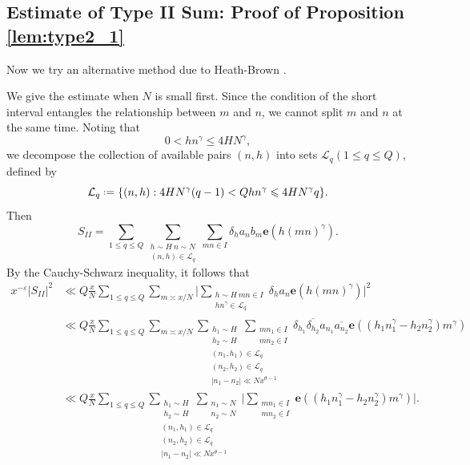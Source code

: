 \documentclass[12pt, reqno, twoside, letterpaper]{amsart}
\numberwithin{equation}{section}
\newcommand{\e}{\ensuremath{\mathbf{e}}}
\newcommand{\cL}{\ensuremath{\mathcal{L}}}
\theoremstyle{customthm}
\theoremstyle{customrem}
\newcommand*{\defeq}{\mathrel{\vcenter{\baselineskip0.5ex \lineskiplimit0pt
			\hbox{\scriptsize.}\hbox{\scriptsize.}}}%
	=}
\begin{document}
\subsection{Estimate of Type II Sum: Proof of Proposition \ref{lem:type2_1}}\label{Estimate of Type II' Sum}

Now we try an alternative method due to Heath-Brown \cite{HB2}. 

We give the estimate when $N$ is small first. Since the condition of the short interval entangles the relationship between $m$ and $n$, we cannot split $m$ and $n$ at the same time. Noting that
$$
0<hn^{\gamma} \leqslant 4HN^{\gamma},
$$
we decompose the collection of available pairs $(n, h)$ into sets $\cL_q(1 \leqslant q \leqslant Q)$, defined by
$$
\cL_q \defeq \{(n,h): 4HN^{\gamma}(q-1) < Qhn^{\gamma} \leqslant 4HN^{\gamma}q \}. 
$$
Then
$$
S_{II} = \sum_{1 \leqslant q \leqslant Q} \sum_{ \substack{h \sim H \ n \sim N \\ (n,h) \in \cL_q}} \sum_{mn \in I} \delta_ha_n b_m \e(h(mn)^\gamma).
$$
By the Cauchy-Schwarz inequality, it follows that
\begin{align}
	\label{4.1}
\nonumber
x^{-\varepsilon}|S_{II}|^2 &\ll Q\frac{x}{N} \sum_{1 \leqslant q \leqslant Q} \sum_{m \asymp x/N} \Big| \sum_{\substack{h \sim H \ mn \in I \\ hn^{\gamma} \in \cL_q}} \delta_h a_n \e(h(mn)^{\gamma}) \Big|^2 \\
\nonumber
&\ll Q\frac{x}{N} \sum_{1 \leqslant q \leqslant Q} \sum_{m \asymp x/N} \underset{\substack{(n_1,h_1) \in \cL_q \\ (n_2,h_2) \in \cL_q \\ |n_1-n_2| \ll Nx^{\theta-1}}}{\sum_{\substack{h_1 \sim H \\ h_2 \sim H}} \sum_{\substack{mn_1 \in I \\ mn_2 \in I}}}  \delta_{h_1} \overline{\delta_{h_2}} a_{n_1} \overline{a_{n_2}} \e((h_1n^{\gamma}_1 - h_2n^{\gamma}_2)m^\gamma) \\
&\ll Q\frac{x}{N} \sum_{1 \leqslant q \leqslant Q} \underset{\substack{(n_1,h_1) \in \cL_q \\ (n_2,h_2) \in \cL_q \\ |n_1-n_2| \ll Nx^{\theta-1}}}{\sum_{\substack{h_1 \sim H \\ h_2 \sim H}} \sum_{\substack{n_1 \sim N \\ n_2 \sim N}}} \Big| \sum_{\substack{mn_1\in I \\ mn_2 \in I}} \e((h_1n^{\gamma}_1 - h_2n^{\gamma}_2)m^\gamma) \Big|.
\end{align}
\end{document}
